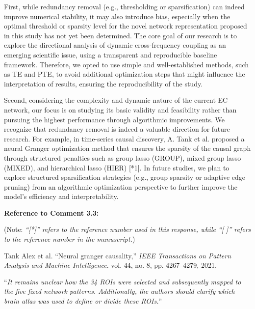 \documentclass[12pt,technote,onecolumn]{IEEEtran}
\begin{document}
First, while redundancy removal (e.g., thresholding or sparsification) can indeed improve numerical stability, it may also introduce bias, especially when the optimal threshold or sparsity level for the novel network representation proposed in this study has not yet been determined. The core goal of our research is to explore the directional analysis of dynamic cross-frequency coupling as an emerging scientific issue, using a transparent and reproducible baseline framework. Therefore, we opted to use simple and well-established methods, such as TE and PTE, to avoid additional optimization steps that might influence the interpretation of results, ensuring the reproducibility of the study.

Second, considering the complexity and dynamic nature of the current EC network, our focus is on studying its basic validity and feasibility rather than pursuing the highest performance through algorithmic improvements. We recognize that redundancy removal is indeed a valuable direction for future research. For example, in time-series causal discovery, A. Tank et al. proposed a neural Granger optimization method that ensures the sparsity of the causal graph through structured penalties such as group lasso (GROUP), mixed group lasso (MIXED), and hierarchical lasso (HIER) [*1]. In future studies, we plan to explore structured sparsification strategies (e.g., group sparsity or adaptive edge pruning) from an algorithmic optimization perspective to further improve the model’s efficiency and interpretability.

\noindent \textbf{Reference to Comment 3.3:} 

\noindent(Note: \textit{``[*]'' refers to the reference number used in this response, while ``[ ]'' refers to the reference number in the manuscript.})

\noindent[*1]\:Tank Alex et al. ``Neural granger causality,” \textit{IEEE Transactions on Pattern Analysis and Machine Intelligence}. vol. 44, no. 8, pp. 4267–4279, 2021.



\vspace{4mm}

 ``{\it It remains unclear how the 34 ROIs were selected and subsequently mapped to the five fixed network patterns. Additionally, the authors should clarify which brain atlas was used to define or divide these ROIs.}''
\vspace{1mm}

\end{document}

